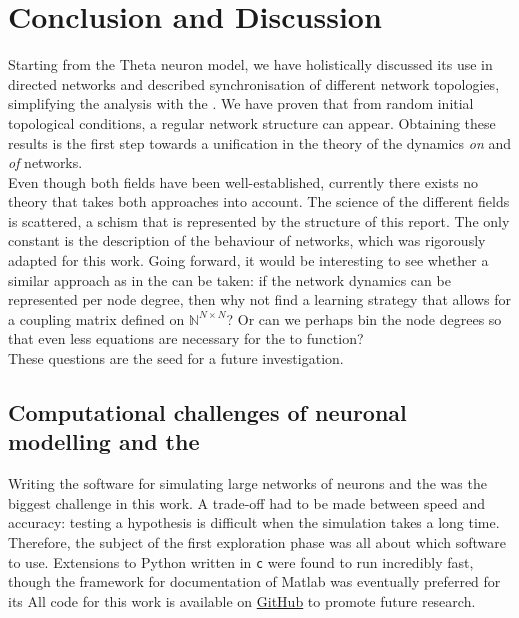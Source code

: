 \newpage
\section{Conclusion and Discussion} \label{sec:ConclusionAndDiscussion}
Starting from the Theta neuron model, we have holistically discussed its use in directed networks and described synchronisation of different network topologies, simplifying the analysis with the \MFR. We have proven that from random initial topological conditions, a regular network structure can appear. Obtaining these results is the first step towards a unification in the theory of the dynamics \textsl{on} and \textsl{of} networks. \\

Even though both fields have been well-established, currently there exists no theory that takes both approaches into account. The science of the different fields is scattered, a schism that is represented by the structure of this report. The only constant is the description of the behaviour of networks, which was rigorously adapted for this work. Going forward, it would be interesting to see whether a similar approach as in the \MFR can be taken: if the network dynamics can be represented per node degree, then why not find a learning strategy that allows for a coupling matrix defined on $\mathbb{N}^{N \times N}$? Or can we perhaps bin the node degrees so that even less equations are necessary for the \MFR to function? \\

These questions are the seed for a future investigation.

\subsection{Computational challenges of neuronal modelling and the \MFR}
Writing the software for simulating large networks of neurons and the \MFR was the biggest challenge in this work. A trade-off had to be made between speed and accuracy: testing a hypothesis is difficult when the simulation takes a long time. Therefore, the subject of the first exploration phase was all about which software to use. Extensions to Python written in \texttt{c} were found to run incredibly fast, though the framework for documentation of Matlab was eventually preferred for its
All code for this work is available on \href{https://github.com/simonaertssen/AdaptiveNeuronalNetworks}{GitHub} to promote future research.



